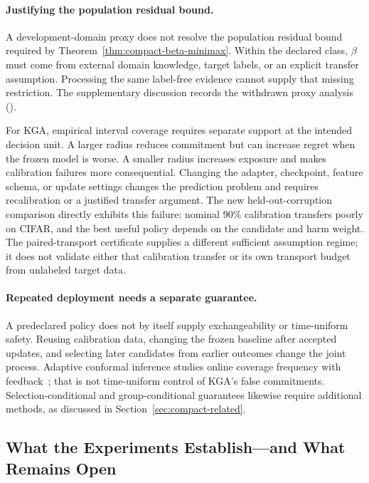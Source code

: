 \paragraph{Justifying the population residual bound.}
\label{par:beta-surrogate-failure}
A development-domain proxy does not resolve the population residual bound required by
Theorem~\ref{thm:compact-beta-minimax}. Within the declared class, $\beta$ must come from
external domain knowledge, target labels, or an explicit transfer assumption.
Processing the same label-free evidence cannot supply that missing restriction.
The supplementary discussion records the withdrawn proxy analysis
().

For KGA, empirical interval coverage requires separate support at the intended decision unit.
A larger radius reduces commitment but can increase regret when the frozen model is worse.
A smaller radius increases exposure and makes calibration failures more consequential.
Changing the adapter, checkpoint, feature schema, or update settings changes the prediction problem
and requires recalibration or a justified transfer argument.
The new held-out-corruption comparison directly exhibits this failure: nominal
90\% calibration transfers poorly on CIFAR, and the best useful policy depends
on the candidate and harm weight. The paired-transport certificate supplies a
different sufficient assumption regime; it does not validate either that
calibration transfer or its own transport budget from unlabeled target data.

\paragraph{Repeated deployment needs a separate guarantee.}
A predeclared policy does not by itself supply exchangeability or time-uniform safety.
Reusing calibration data, changing the frozen baseline after accepted updates, and selecting later
candidates from earlier outcomes change the joint process. Adaptive conformal inference studies
online coverage frequency with feedback~\cite{gibbs2021adaptive}; that is not time-uniform control
of KGA's false commitments. Selection-conditional and group-conditional guarantees likewise require
additional methods, as discussed in Section~\ref{sec:compact-related}.

\subsection{What the Experiments Establish---and What Remains Open}
\label{sec:empirical-delimitations}

